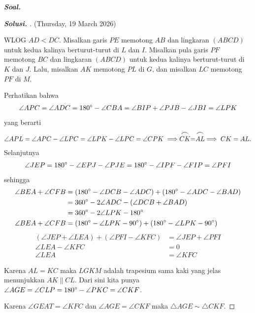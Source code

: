 \textbf{\textit{Soal.}} 
\begin{proof}[\textbf{Solusi. }] (Thursday, 19 March 2026) 
    

    WLOG $AD < DC$. Misalkan garis $PE$ memotong $AB$ dan lingkaran $(ABCD)$ untuk kedua kalinya berturut-turut di $L$ dan $I$. Misalkan pula garis $PF$ memotong $BC$ dan lingkaran $(ABCD)$ untuk kedua kalinya berturut-turut di $K$ dan $J$. Lalu, misalkan $AK$ memotong $PL$ di $G$, dan misalkan $LC$ memotong $PF$ di $M$.

    Perhatikan bahwa
    \begin{align*}
        \angle APC = \angle ADC = 180^\circ - \angle CBA = \angle BIP + \angle PJB - \angle JBI = \angle LPK
    \end{align*}
    yang berarti
    \begin{align*}
        \angle APL = \angle APC - \angle LPC = \angle LPK - \angle LPC = \angle CPK \implies \stackrel{\mbox{\large$\frown$}}{CK} = \stackrel{\mbox{\large$\frown$}}{AL} \implies CK = AL.
    \end{align*}
    Selanjutnya
    \begin{align*}
        \angle JEP = 180^\circ - \angle EPJ - \angle PJE = 180^\circ - \angle IPF - \angle FIP = \angle PFI
    \end{align*}
    sehingga
    \begin{align*}
        \angle BEA + \angle CFB &= (180^\circ - \angle DCB - \angle ADC) + (180^\circ - \angle ADC - \angle BAD)\\
        &= 360^\circ - 2\angle ADC - (\angle DCB + \angle BAD)\\
        &= 360^\circ  - 2\angle LPK - 180^\circ\\
        \angle BEA + \angle CFB &= (180^\circ - \angle LPK - 90^\circ) + (180^\circ - \angle LPK - 90^\circ)
    \end{align*}
    \begin{align*}
        (\angle JEP + \angle LEA) + (\angle PFI - \angle KFC)  &= \angle JEP + \angle PFI\\
        \angle LEA - \angle KFC &= 0\\
        \angle LEA &= \angle KFC
    \end{align*}

    Karena $AL = KC$ maka $LGKM$ adalah trapesium sama kaki yang jelas menunjukkan $AK \parallel CL$. Dari sini kita punya
    $\angle AGE = \angle CLP = 180^\circ - \angle PKC = \angle CKF$.

    Karena $\angle GEA T= \angle KFC$ dan $\angle AGE = \angle CKF$ maka $\triangle AGE \sim \triangle CKF$.


\end{proof}
